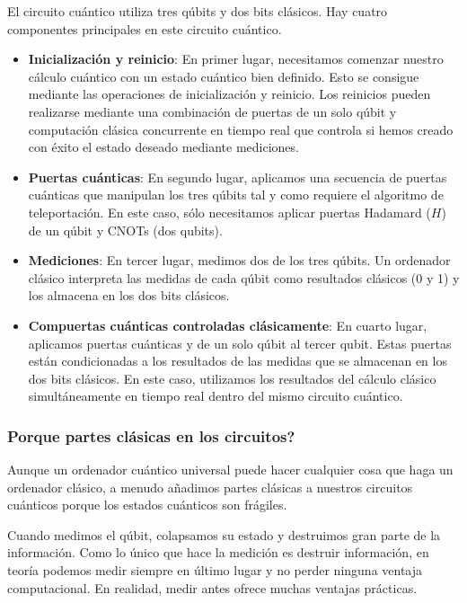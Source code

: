 \documentclass[a4paper,11pt]{book} %
\numberwithin{equation}{chapter}
\begin{document}
El circuito cuántico utiliza tres qúbits y dos bits clásicos. Hay cuatro componentes principales en este circuito cuántico.
\begin{itemize}
	\item \textbf{Inicialización y reinicio}: 
	En primer lugar, necesitamos comenzar nuestro cálculo cuántico con un estado cuántico bien definido. Esto se consigue mediante las operaciones de inicialización y reinicio. Los reinicios pueden realizarse mediante una combinación de puertas de un solo qúbit y computación clásica concurrente en tiempo real que controla si hemos creado con éxito el estado deseado mediante mediciones. 
 
 	\item \textbf{Puertas cuánticas}: 
 	En segundo lugar, aplicamos una secuencia de puertas cuánticas que manipulan los tres qúbits tal y como requiere el algoritmo de teleportación. En este caso, sólo necesitamos aplicar puertas Hadamard ($H$) de un qúbit y CNOTs (dos qubits).

 	
 	\item \textbf{Mediciones}:
 	En tercer lugar, medimos dos de los tres qúbits. Un ordenador clásico interpreta las medidas de cada qúbit como resultados clásicos (0 y 1) y los almacena en los dos bits clásicos.
 	
 	\item \textbf{Compuertas cuánticas controladas clásicamente}:
 	En cuarto lugar, aplicamos puertas cuánticas y de un solo qúbit al tercer qubit. Estas puertas están condicionadas a los resultados de las medidas que se almacenan en los dos bits clásicos. En este caso, utilizamos los resultados del cálculo clásico simultáneamente en tiempo real dentro del mismo circuito cuántico.
\end{itemize}



		\subsubsection{Porque partes clásicas en los circuitos?}
		
Aunque un ordenador cuántico universal puede hacer cualquier cosa que haga un ordenador clásico, a menudo añadimos partes clásicas a nuestros circuitos cuánticos porque los estados cuánticos son frágiles.

Cuando medimos el qúbit, colapsamos su estado y destruimos gran parte de la información. Como lo único que hace la medición es destruir información, en teoría podemos medir siempre en último lugar y no perder ninguna ventaja computacional. En realidad, medir antes ofrece muchas ventajas prácticas.
\end{document}

